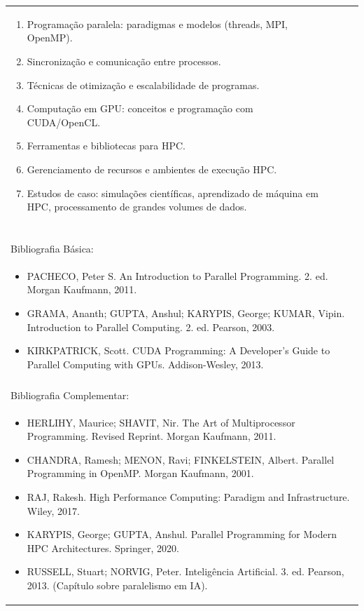 \documentclass[11pt]{article}
\begin{document}
\begin{center}
\begin{longtable}{|p{4cm}|p{4cm}|p{4cm}|p{4cm}|}
{\begin{enumerate}
\item Programação paralela: paradigmas e modelos (threads, MPI, OpenMP).
\item Sincronização e comunicação entre processos.
\item Técnicas de otimização e escalabilidade de programas.
\item Computação em GPU: conceitos e programação com CUDA/OpenCL.
\item Ferramentas e bibliotecas para HPC.
\item Gerenciamento de recursos e ambientes de execução HPC.
\item Estudos de caso: simulações científicas, aprendizado de máquina em HPC, processamento de grandes volumes de dados.\end{enumerate}}\\
\multicolumn{4}{|p{16cm}|}{}\\
\multicolumn{4}{|p{16cm}|}{}\\
\multicolumn{4}{|p{16cm}|}{\vspace{-1cm}}\\
\multicolumn{4}{|p{16cm}|}{}\\
\hline
\multicolumn{4}{|p{16cm}|}{Bibliografia Básica:}\\
\multicolumn{4}{|p{16cm}|}{%
\begin{itemize}\item PACHECO, Peter S. An Introduction to Parallel Programming. 2. ed. Morgan Kaufmann, 2011.
\item GRAMA, Ananth; GUPTA, Anshul; KARYPIS, George; KUMAR, Vipin. Introduction to Parallel Computing. 2. ed. Pearson, 2003.
\item KIRKPATRICK, Scott. CUDA Programming: A Developer's Guide to Parallel Computing with GPUs. Addison-Wesley, 2013.\end{itemize}}\\
\multicolumn{4}{|p{16cm}|}{}\\
\hline
\multicolumn{4}{|p{16cm}|}{Bibliografia Complementar:}\\
\multicolumn{4}{|p{16cm}|}{%
\begin{itemize}\item HERLIHY, Maurice; SHAVIT, Nir. The Art of Multiprocessor Programming. Revised Reprint. Morgan Kaufmann, 2011.
\item CHANDRA, Ramesh; MENON, Ravi; FINKELSTEIN, Albert. Parallel Programming in OpenMP. Morgan Kaufmann, 2001.
\item RAJ, Rakesh. High Performance Computing: Paradigm and Infrastructure. Wiley, 2017.
\item KARYPIS, George; GUPTA, Anshul. Parallel Programming for Modern HPC Architectures. Springer, 2020.
\item RUSSELL, Stuart; NORVIG, Peter. Inteligência Artificial. 3. ed. Pearson, 2013. (Capítulo sobre paralelismo em IA).\end{itemize}}\\
\hline
\end{longtable}
\end{center}
\end{document}

